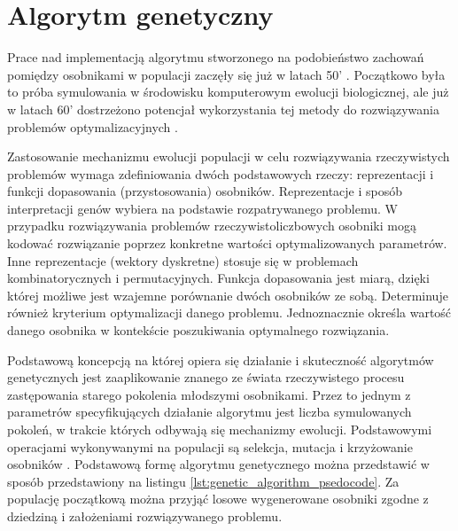\section{Algorytm genetyczny}
\label{sec:algorytm_genetyczny}
\par 
Prace nad implementacją algorytmu stworzonego na podobieństwo zachowań pomiędzy osobnikami w populacji zaczęły się już w latach 50' \cite{barker1958simulation}. Początkowo była to próba symulowania w środowisku komputerowym ewolucji biologicznej, ale już w latach 60' dostrzeżono potencjał wykorzystania tej metody do rozwiązywania problemów optymalizacyjnych \cite{bremermann1962optimization}.
\par
Zastosowanie mechanizmu ewolucji populacji w celu rozwiązywania rzeczywistych problemów wymaga zdefiniowania dwóch podstawowych rzeczy: reprezentacji i funkcji dopasowania (przystosowania) osobników. Reprezentacje i sposób interpretacji genów wybiera na podstawie rozpatrywanego problemu. W przypadku rozwiązywania problemów rzeczywistoliczbowych osobniki mogą kodować rozwiązanie poprzez konkretne wartości optymalizowanych parametrów. Inne reprezentacje (wektory dyskretne) stosuje się w problemach kombinatorycznych i permutacyjnych. Funkcja dopasowania jest miarą, dzięki której możliwe jest wzajemne porównanie dwóch osobników ze sobą. Determinuje również kryterium optymalizacji danego problemu. Jednoznacznie określa wartość danego osobnika w kontekście poszukiwania optymalnego rozwiązania. 
\par
Podstawową koncepcją na której opiera się działanie i skuteczność algorytmów genetycznych jest zaaplikowanie znanego ze świata rzeczywistego procesu zastępowania starego pokolenia młodszymi osobnikami. Przez to jednym z parametrów specyfikujących działanie algorytmu jest liczba symulowanych pokoleń, w trakcie których odbywają się mechanizmy ewolucji. Podstawowymi operacjami wykonywanymi na populacji są selekcja, mutacja i krzyżowanie osobników \cite{sudholt2008computational}. Podstawową formę algorytmu genetycznego można przedstawić w sposób przedstawiony na listingu \ref{lst:genetic_algorithm_psedocode}. Za populację początkową można przyjąć losowe wygenerowane osobniki zgodne z dziedziną i założeniami rozwiązywanego problemu.
